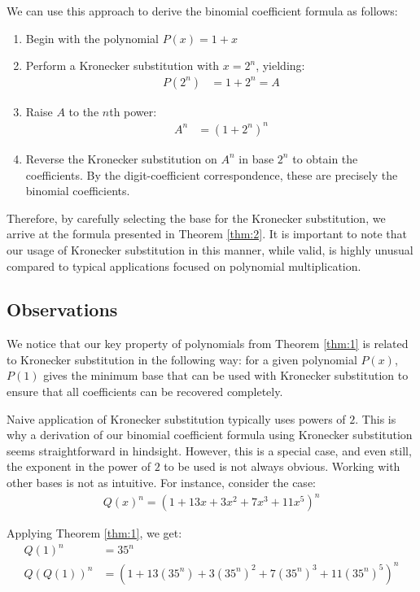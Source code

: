 \documentclass{article}
\theoremstyle{plain}
\theoremstyle{definition}
\begin{document}
We can use this approach to derive the binomial coefficient formula as follows:
\begin{enumerate}
    \item Begin with the polynomial $P(x) = 1 + x$
    \item Perform a Kronecker substitution with $x = 2^{n}$, yielding:
    \begin{align}
    P(2^{n}) &= 1 + 2^{n} = A
    \end{align}
    \item Raise $A$ to the $n$th power:
    \begin{align}
    A^n &= (1 + 2^n)^n
    \end{align}
    \item Reverse the Kronecker substitution on $A^n$ in base $2^n$ to obtain the coefficients. By the digit-coefficient correspondence, these are precisely the binomial coefficients.
\end{enumerate}
Therefore, by carefully selecting the base for the Kronecker substitution, we arrive at the formula presented in Theorem \ref{thm:2}. It is important to note that our usage of Kronecker substitution in this manner, while valid, is highly unusual compared to typical applications focused on polynomial multiplication.

\subsection{Observations}
We notice that our key property of polynomials from Theorem \ref{thm:1} is related to Kronecker substitution in the following way: for a given polynomial $P(x)$, $P(1)$ gives the minimum base that can be used with Kronecker substitution to ensure that all coefficients can be recovered completely.

Naive application of Kronecker substitution typically uses powers of \(2\). This is why a derivation of our binomial coefficient formula using Kronecker substitution seems straightforward in hindsight. However, this is a special case, and even still, the exponent in the power of \(2\) to be used is not always obvious. Working with other bases is not as intuitive. For instance, consider the case:
\begin{align}
    Q(x)^n = (1 + 13x + 3x^2 + 7x^3 + 11x^5)^n
\end{align}

Applying Theorem \ref{thm:1}, we get:
\begin{align}
    Q(1)^n &= 35^n \\
    Q(Q(1))^n &= (1 + 13(35^n) + 3(35^n)^2 + 7(35^n)^3 + 11(35^n)^5)^n
\end{align}
\end{document}
